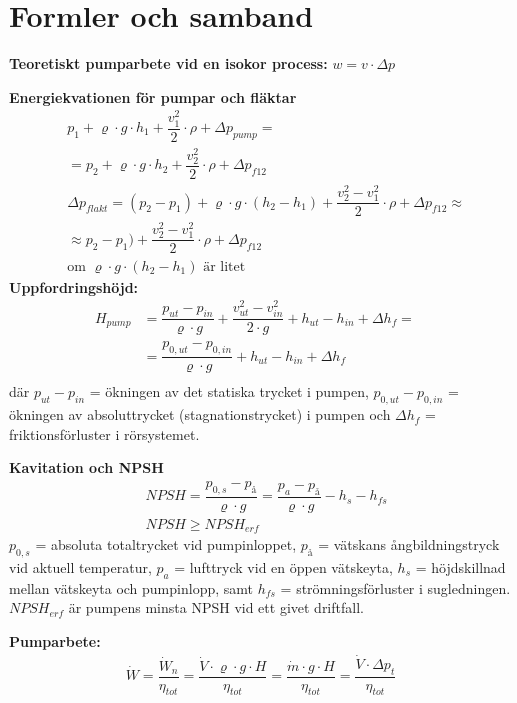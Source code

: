 \section*{Formler och samband}
	\textbf{Teoretiskt pumparbete vid en isokor process: } $w=v \cdot \Delta p$ \par
\textbf{Energiekvationen för pumpar och fläktar}  
	\begin{align*}
    & p_1 + \varrho \cdot g \cdot h_1 + \dfrac{v_1^2}{2} \cdot \rho +  \Delta p_{pump} = \\ 
    & = p_2 + \varrho \cdot g \cdot h_2 + \dfrac{v_2^2}{2} \cdot \rho +  \Delta p_{f12} \\
		& \Delta p_{flakt} = (p_2 - p_1) + \varrho \cdot g \cdot( h_2 -  h_1) + \dfrac{v_2^2-v_1^2}{2} \cdot \rho +  \Delta p_{f12} \approx \\
		&\approx p_2 - p_1) +  \dfrac{v_2^2-v_1^2}{2} \cdot \rho +  \Delta p_{f12} \\
		&\text{om }\varrho \cdot g \cdot( h_2 -  h_1) \text{ är litet}
	\end{align*}
\textbf{Uppfordringshöjd:} 
	\begin{align*}
    H_{pump} & = \dfrac{p_{ut}-p_{in}}{\varrho \cdot g}+\dfrac{v^2_{ut}-v^2_{in}}{2\cdot g}+h_{ut}-h_{in} + \Delta h_f = &\\
    				 & = \dfrac{p_{0,ut}-p_{0,in}}{\varrho \cdot g}+h_{ut}-h_{in} + \Delta h_f \\
	\end{align*}
där $p_{ut}-p_{in}$ = ökningen av det statiska trycket i pumpen, $p_{0,ut}-p_{0,in}$ = ökningen av absoluttrycket (stagnationstrycket) i pumpen och $\Delta h_f$ = friktionsförluster i rörsystemet. \par
\textbf{Kavitation och NPSH}
 \begin{align*}
	& \textit{NPSH} = \dfrac{p_{0,s} - p_\text{å}}{\varrho \cdot g} = \dfrac{p_a - p_\text{å}}{\varrho \cdot g} - h_s - h_{fs} \\
	&	\textit{NPSH} \geq \textit{NPSH}_{erf}
 \end{align*}
$p_{0,s}$ = absoluta totaltrycket vid pumpinloppet, $p_\text{å}$ = vätskans ångbildningstryck vid aktuell temperatur, $p_a$ = lufttryck vid en öppen vätskeyta, $h_s$ = höjdskillnad mellan vätskeyta och pumpinlopp, samt $h_{fs}$ = strömningsförluster i sugledningen. $\textit{NPSH}_{erf}$ är pumpens minsta NPSH vid ett givet driftfall.\par
	\textbf{Pumparbete: }
	\begin{align*}
    & \dot{W} = \dfrac{\dot{W}_n}{\eta_{tot}} = \dfrac{\dot{V}\cdot \varrho \cdot g \cdot{H}}{\eta_{tot}}= \dfrac{\dot{m}\cdot g \cdot H }{\eta_{tot}}=  
    \dfrac{\dot{V}\cdot\Delta p_t}{\eta_{tot}} & 
	\end{align*}
